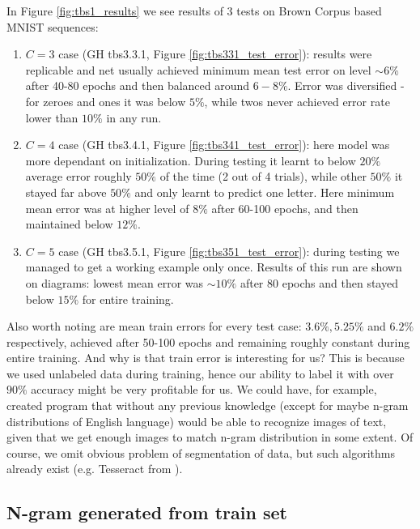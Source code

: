 \documentclass[declaration,shortabstract,lic,english]{iithesis}
\begin{document}
In Figure \ref{fig:tbs1_results} we see results of 3 tests on Brown Corpus based MNIST sequences:
\begin{enumerate}
\item $C=3$ case (GH tbs3.3.1, Figure \ref{fig:tbs331_test_error}): results were replicable and net usually achieved minimum mean test error on level $\sim6\%$ after 40-80 epochs and then balanced around $6-8\%$. Error was diversified - for zeroes and ones it was below $5\%$, while twos never achieved error rate lower than $10\%$ in any run.
\item $C=4$ case (GH tbs3.4.1, Figure \ref{fig:tbs341_test_error}): here model was more dependant on initialization. During testing it learnt to below $20\%$ average error roughly $50\%$ of the time (2 out of 4 trials), while other $50\%$ it stayed far above $50\%$ and only learnt to predict one letter. Here minimum mean error was at higher level of $8\%$ after 60-100 epochs, and then maintained below $12\%$.
\item $C=5$ case (GH tbs3.5.1, Figure \ref{fig:tbs351_test_error}): during testing we managed to get a working example only once. Results of this run are shown on diagrams: lowest mean error was $\sim 10\%$ after 80 epochs and then stayed below $15\%$ for entire training.
\end{enumerate}

Also worth noting are mean train errors for every test case: $3.6\%, 5.25\%$ and $6.2\%$ respectively, achieved after 50-100 epochs and remaining roughly constant during entire training. And why is that train error is interesting for us? This is because we used unlabeled data during training, hence our ability to label it with over $90\%$ accuracy might be very profitable for us. We could have, for example, created program that without any previous knowledge (except for maybe n-gram distributions of English language) would be able to recognize images of text, given that we get enough images to match n-gram distribution in some extent. Of course, we omit obvious problem of segmentation of data, but such algorithms already exist (e.g. Tesseract from \citet{kay2007tesseract}).

\subsection{N-gram generated from train set}
\end{document}
